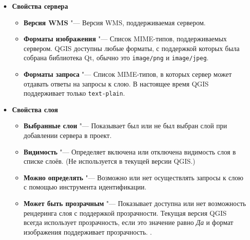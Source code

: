 \begin{itemize}[label=--]
\item \textbf{Свойства сервера}

\begin{itemize}[label=--]
\item \textbf{Версия WMS}          "--- Версия WMS, поддерживаемая сервером.

\item \textbf{Форматы изображения} "--- Список MIME-типов, поддерживаемых
                                       сервером. QGIS доступны любые форматы, с
                                       поддержкой которых была собрана
                                       библиотека Qt, обычно это
                                       \texttt{image/png} и \texttt{image/jpeg}.

\item \textbf{Форматы запроса}     "--- Список MIME-типов, в которых сервер может
                                       отдавать ответы на запросы к слою. В
                                       настоящее время QGIS поддерживает только
                                       \texttt{text-plain}.

\end{itemize}

\item \textbf{Свойства слоя}

\begin{itemize}[label=--]
\item \textbf{Выбранные слои}        "--- Показывает был или не был выбран слой
                                         при добавлении сервера в проект.

\item \textbf{Видимость}             "--- Определяет включена или отключена
                                         видимость слоя в списке слоёв. (Не
                                         используется в текущей версии QGIS.)

\item \textbf{Можно определять}      "--- Возможно или нет осуществлять
                                         запросы к слою с помощью инструмента
                                         идентификации.

\item \textbf{Может быть прозрачным} "--- Показывает доступна или нет
                                         возможность рендеринга слоя с
                                         поддержкой прозрачности. Текущая версия
                                         QGIS всегда использует прозрачность,
                                         если это значение равно \textsl{Да} и
                                         формат изображения поддерживает
                                         прозрачность.
                                    .


\end{itemize}
\end{itemize}
